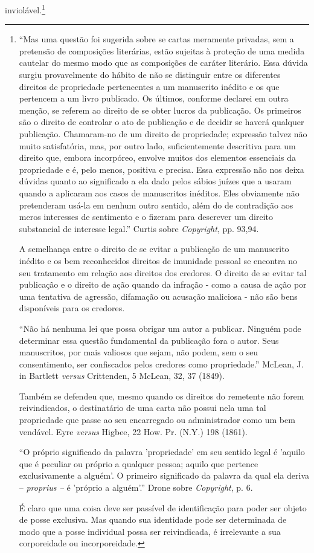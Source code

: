 inviolável.\footnote{``Mas uma questão foi sugerida sobre se cartas
  meramente privadas, sem a pretensão de composições literárias, estão
  sujeitas à proteção de uma medida cautelar do mesmo modo que as
  composições de caráter literário. Essa dúvida surgiu provavelmente do
  hábito de não se distinguir entre os diferentes direitos de
  propriedade pertencentes a um manuscrito inédito e os que pertencem a
  um livro publicado. Os últimos, conforme declarei em outra menção, se
  referem ao direito de se obter lucros da publicação. Os primeiros são
  o direito de controlar o ato de publicação e de decidir se haverá
  qualquer publicação. Chamaram-no de um direito de propriedade;
  expressão talvez não muito satisfatória, mas, por outro lado,
  suficientemente descritiva para um direito que, embora incorpóreo,
  envolve muitos dos elementos essenciais da propriedade e é, pelo
  menos, positiva e precisa. Essa expressão não nos deixa dúvidas quanto
  ao significado a ela dado pelos sábios juízes que a usaram quando a
  aplicaram aos casos de manuscritos inéditos. Eles obviamente não
  pretenderam usá-la em nenhum outro sentido, além do de contradição aos
  meros interesses de sentimento e o fizeram para descrever um direito
  substancial de interesse legal.'' Curtis sobre \emph{Copyright}, pp.
  93,94.

  A semelhança entre o direito de se evitar a publicação de um
  manuscrito inédito e os bem reconhecidos direitos de imunidade pessoal
  se encontra no seu tratamento em relação aos direitos dos credores. O
  direito de se evitar tal publicação e o direito de ação quando da
  infração - como a causa de ação por uma tentativa de agressão,
  difamação ou acusação maliciosa - não são bens disponíveis para os
  credores.

  ``Não há nenhuma lei que possa obrigar um autor a publicar. Ninguém
  pode determinar essa questão fundamental da publicação fora o autor.
  Seus manuscritos, por mais valiosos que sejam, não podem, sem o seu
  consentimento, ser confiscados pelos credores como propriedade.''
  McLean, J. in Bartlett \emph{versus} Crittenden, 5 McLean, 32, 37
  (1849).

  Também se defendeu que, mesmo quando os direitos do remetente não
  forem reivindicados, o destinatário de uma carta não possui nela uma
  tal propriedade que passe ao seu encarregado ou administrador como um
  bem vendável. Eyre \emph{versus} Higbee, 22 How. Pr. (N.Y.) 198
  (1861).

  ``O próprio significado da palavra 'propriedade' em seu sentido legal
  é 'aquilo que é peculiar ou próprio a qualquer pessoa; aquilo que
  pertence exclusivamente a alguém'. O primeiro significado da palavra
  da qual ela deriva -- \emph{proprius --} é 'próprio a alguém'.'' Drone
  sobre \emph{Copyright}, p. 6.

  É claro que uma coisa deve ser passível de identificação para poder
  ser objeto de posse exclusiva. Mas quando sua identidade pode ser
  determinada de modo que a posse individual possa ser reivindicada, é
  irrelevante a sua corporeidade ou incorporeidade.}

